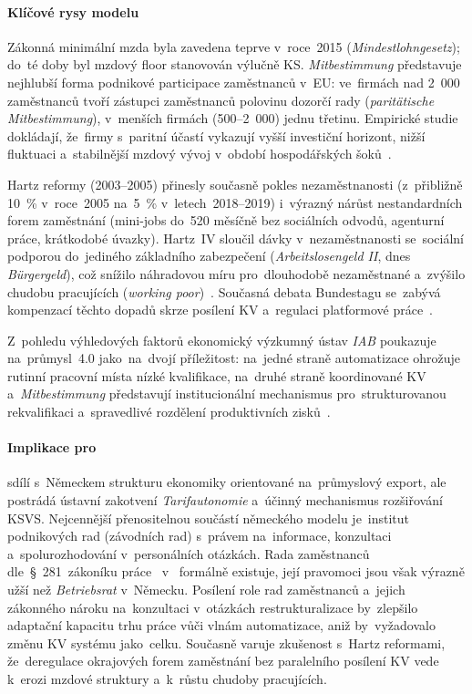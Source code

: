 \paragraph{Klíčové rysy modelu}\label{par:de_rysy}

Zákonná minimální mzda byla zavedena teprve v~roce~2015
(\textit{Mindestlohngesetz}); do~té doby byl mzdový floor stanovován výlučně
\acs{KS}. \emph{Mitbestimmung} představuje nejhlubší forma podnikové
participace zaměstnanců v~\acs{EU}: ve~firmách nad 2~000 zaměstnanců tvoří
zástupci zaměstnanců polovinu dozorčí rady (\textit{paritätische Mitbestimmung}),
v~menších firmách (500--2~000) jednu třetinu. Empirické studie dokládají, že~firmy
s~paritní účastí vykazují vyšší investiční horizont, nižší fluktuaci
a~stabilnější mzdový vývoj v~období hospodářských šoků~\cite{Hala_SystemySocialnihoDialogu2013}.

Hartz reformy (2003--2005) přinesly současně pokles nezaměstnanosti
(z~přibližně \SI{10}{\percent} v~roce~2005 na~\SI{5}{\percent} v~letech~2018--2019)
i~výrazný nárůst nestandardních forem zaměstnání (mini-jobs do~\SI{520}{\eur}
měsíčně bez sociálních odvodů, agenturní práce, krátkodobé úvazky). Hartz~IV
sloučil dávky v~nezaměstnanosti se~sociální podporou do~jediného základního
zabezpečení (\textit{Arbeitslosengeld II}, dnes \textit{Bürgergeld}), což snížilo
náhradovou míru pro~dlouhodobě nezaměstnané a~zvýšilo chudobu pracujících
(\emph{working poor})~\cite{Petricek_PS2_NemeckyModel_2019}. Současná
debata Bundestagu se~zabývá kompenzací těchto dopadů skrze posílení \acs{KV}
a~regulaci platformové práce~\cite{Bundestag_EU6_013_26}.

Z~pohledu výhledových faktorů ekonomický výzkumný ústav \textit{IAB}
poukazuje na~průmysl~4.0 jako~na~dvojí příležitost: na~jedné straně
automatizace ohrožuje rutinní pracovní místa nízké kvalifikace, na~druhé
straně koordinované \acs{KV} a~\textit{Mitbestimmung} představují institucionální
mechanismus pro~strukturovanou rekvalifikaci a~spravedlivé rozdělení
produktivních zisků~\cite{Weber_Industrie40_2015}.

\paragraph{Implikace pro~}\label{par:de_implikace}

 sdílí s~Německem strukturu ekonomiky orientované na~průmyslový
export, ale postrádá ústavní zakotvení \emph{Tarifautonomie} a~účinný mechanismus
rozšiřování \acs{KSVS}. Nejcennější přenositelnou součástí německého modelu je~institut
podnikových rad (závodních rad) s~právem na~informace, konzultaci a~spolurozhodování
v~personálních otázkách. Rada zaměstnanců dle~\S~281~zákoníku práce~\cite{zakon_zp_2006}
v~ formálně existuje, její pravomoci jsou však výrazně užší než
\textit{Betriebsrat} v~Německu. Posílení role rad zaměstnanců a~jejich
zákonného nároku na~konzultaci v~otázkách restrukturalizace by~zlepšilo
adaptační kapacitu trhu práce vůči vlnám automatizace, aniž by~vyžadovalo
změnu \acs{KV} systému jako~celku. Současně varuje zkušenost s~Hartz reformami,
že~deregulace okrajových forem zaměstnání bez paralelního posílení \acs{KV}
vede k~erozi mzdové struktury a~k~růstu chudoby pracujících.
